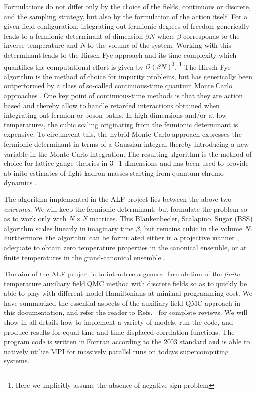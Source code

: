 \documentclass{SciPost}
\begin{document}
 Formulations do not differ  only  by the choice of the fields, continuous or discrete,  and the sampling strategy, but also by the  formulation of the action itself.
For a given field configuration, integrating out  fermionic degrees of freedom generically leads to a fermionic determinant of dimension $\beta N$ where $\beta $  corresponds to the inverse temperature and $N$ to the volume of the system.  Working  with this determinant leads to the  Hirsch-Fye approach \cite{HirschFye86}  and its time complexity which quantifies the computational effort is given by  $\mathcal{O}\left( \beta N \right)^3$. \footnote{Here we implicitly assume the absence of negative sign problem}  The Hirsch-Fye  algorithm is the method of choice for impurity problems, but has  generically been outperformed by a class of so-called continuous-time quantum Monte Carlo approaches  
\cite{Gull_rev,Assaad14_rev, Assaad07}.    One key point of continuous-time methods  is that they are action based  and thereby allow to handle retarded interactions obtained when integrating out fermion or boson baths.  In high dimensions and/or at low temperatures, the cubic scaling originating from the fermionic determinant is expensive. To circumvent this, the hybrid Monte-Carlo approach  \cite{Duane87,Scalettar86}  expresses the fermionic determinant in terms of a Gaussian integral thereby introducing a new variable in the Monte Carlo integration.    The resulting algorithm is the method of choice for lattice gauge theories in 3+1 dimensions   and has been used to provide ab-inito  estimates of light hadron masses starting from quantum chromo dynamics \cite{Durr08}.


The algorithm implemented in the ALF project  lies between the  above two  \textit{extremes}.  We will keep the fermionic determinant, but formulate  the problem so as to  work only with $N\times N$ matrices.    This 
Blankenbecler,  Scalapino, Sugar (BSS)  algorithm scales linearly in  imaginary time $\beta$, but remains cubic in the volume $N$.    Furthermore, the algorithm can be formulated either in a projective manner \cite{Sugiyama86,Sorella89},  adequate to obtain zero temperature properties in the  canonical ensemble,  or at finite temperatures in the  grand-canonical ensemble \cite{White89}.

The aim of the ALF project is to introduce a general formulation of the \textit{ finite } temperature  auxiliary field QMC method with discrete  fields so as to quickly be able to play with different model Hamiltonians  at  minimal programming cost. We have summarized  the essential aspects of the   auxiliary field QMC  approach  in this documentation,   and   refer  the reader  to  Refs.~\cite{Assaad08_rev,Assaad02} for  complete  reviews.    
We will show in  all details how to implement a variety of models, run the code, and produce  results for  equal time and time displaced correlation functions. 
The program code is written in Fortran according to the 2003 standard and is able to natively utilize MPI for massively parallel runs on todays supercomputing systems.
\end{document}
